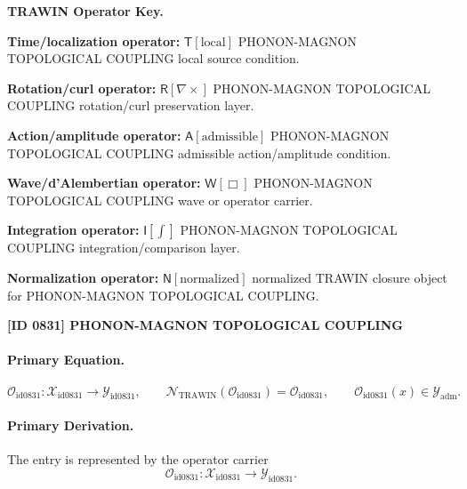 \par\vspace{0.45\baselineskip}
\noindent\begin{minipage}[t]{\linewidth}
\begingroup
\small
\raggedright
\textbf{TRAWIN Operator Key.}\par
\noindent\textbf{Time/localization operator:} $\mathsf{T}\!\left[\mathrm{local}\right]$ PHONON-MAGNON TOPOLOGICAL COUPLING local source condition.\par
\noindent\textbf{Rotation/curl operator:} $\mathsf{R}\!\left[\nabla\times\right]$ PHONON-MAGNON TOPOLOGICAL COUPLING rotation/curl preservation layer.\par
\noindent\textbf{Action/amplitude operator:} $\mathsf{A}\!\left[\mathrm{admissible}\right]$ PHONON-MAGNON TOPOLOGICAL COUPLING admissible action/amplitude condition.\par
\noindent\textbf{Wave/d'Alembertian operator:} $\mathsf{W}\!\left[\Box\right]$ PHONON-MAGNON TOPOLOGICAL COUPLING wave or operator carrier.\par
\noindent\textbf{Integration operator:} $\mathsf{I}\!\left[\int\right]$ PHONON-MAGNON TOPOLOGICAL COUPLING integration/comparison layer.\par
\noindent\textbf{Normalization operator:} $\mathsf{N}\!\left[\mathrm{normalized}\right]$ normalized TRAWIN closure object for PHONON-MAGNON TOPOLOGICAL COUPLING.\par
\endgroup
\end{minipage}

\clearpage
\noindent\textbf{[ID 0831] PHONON-MAGNON TOPOLOGICAL COUPLING}\par
\vspace{0.35em}
\paragraph{Primary Equation.}
\[
\mathcal{O}_{\mathrm{id0831}}:\mathcal{X}_{\mathrm{id0831}}\longrightarrow \mathcal{Y}_{\mathrm{id0831}},\qquad
\mathcal{N}_{\mathrm{TRAWIN}}(\mathcal{O}_{\mathrm{id0831}})=\mathcal{O}_{\mathrm{id0831}},\qquad
\mathcal{O}_{\mathrm{id0831}}(x)\in\mathcal{Y}_{\mathrm{adm}}.
\]

\paragraph{Primary Derivation.} The entry is represented by the operator carrier\[
\mathcal{O}_{\mathrm{id0831}}:\mathcal{X}_{\mathrm{id0831}}\longrightarrow \mathcal{Y}_{\mathrm{id0831}}.
\]


